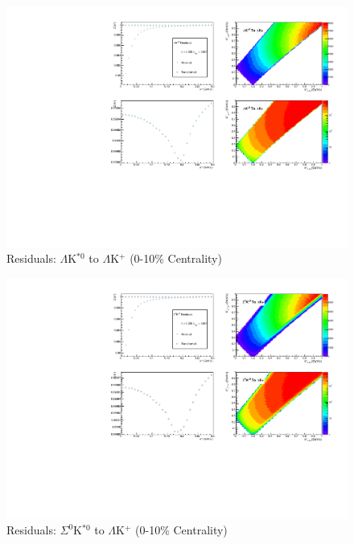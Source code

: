 \documentclass[../AnalysisNoteJBuxton.tex]{subfiles}
\begin{document}
\begin{figure}[h]
  \centering
  \includegraphics[width=\textwidth]{9_AdditionalFigures/Figures/Residuals/LamKchP/Residuals_LamKchP_0010_LamKSt0_MomResCrctn_NonFlatBgdCrctn_ResidualsIncluded_UsingCoulombOnlyInterpCfs.pdf}
  \caption[Residuals: $\Lambda$K$^{*0}$ to $\Lambda$K$^{+}$ (0-10\% Centrality)]{Residuals: $\Lambda$K$^{*0}$ to $\Lambda$K$^{+}$ (0-10\% Centrality)}
  \label{fig:Res_LamKchP_0010_LamKSt0}
\end{figure}


\begin{figure}[h]
  \centering
  \includegraphics[width=\textwidth]{9_AdditionalFigures/Figures/Residuals/LamKchP/Residuals_LamKchP_0010_Sig0KSt0_MomResCrctn_NonFlatBgdCrctn_ResidualsIncluded_UsingCoulombOnlyInterpCfs.pdf}
  \caption[Residuals: $\Sigma^{0}$K$^{*0}$ to $\Lambda$K$^{+}$ (0-10\% Centrality)]{Residuals: $\Sigma^{0}$K$^{*0}$ to $\Lambda$K$^{+}$ (0-10\% Centrality)}
  \label{fig:Res_LamKchP_0010_Sig0KSt0}
\end{figure}
\end{document}
